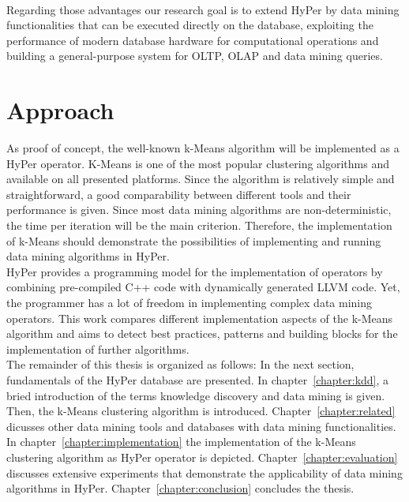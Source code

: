 \\
Regarding those advantages our research goal is to extend HyPer by data mining functionalities that can be executed directly on the database, exploiting the performance of modern database hardware for computational operations and building a general-purpose system for OLTP, OLAP and data mining queries. 


\section{Approach}
As proof of concept, the well-known k-Means algorithm will be implemented as a HyPer operator. K-Means is one of the most popular  clustering algorithms and available on all presented platforms. Since the algorithm is relatively simple and straightforward, a good comparability between different tools and their performance is given. Since most data mining algorithms are non-deterministic, the time per iteration will be the main criterion. Therefore, the implementation of k-Means should demonstrate the possibilities of implementing and running data mining algorithms in HyPer.
\\
HyPer provides a programming model for the implementation of operators by combining pre-compiled C++ code with dynamically generated LLVM code. Yet, the programmer has a lot of freedom in implementing complex data mining operators. This work compares different implementation aspects of the k-Means algorithm and aims to detect best practices, patterns and building blocks for the implementation of further algorithms.
\\
The remainder of this thesis is organized as follows: In the next section, fundamentals of the HyPer database are presented. In chapter~\ref{chapter:kdd}, a bried introduction of the terms knowledge discovery and data mining is given. Then, the k-Means clustering algorithm is introduced. Chapter~\ref{chapter:related} dicusses other data mining tools and databases with data mining functionalities. In chapter~\ref{chapter:implementation} the implementation of the k-Means clustering algorithm as HyPer operator is depicted. Chapter~\ref{chapter:evaluation} discusses extensive experiments that demonstrate the applicability of data mining algorithms in HyPer. Chapter~\ref{chapter:conclusion} concludes the thesis.



